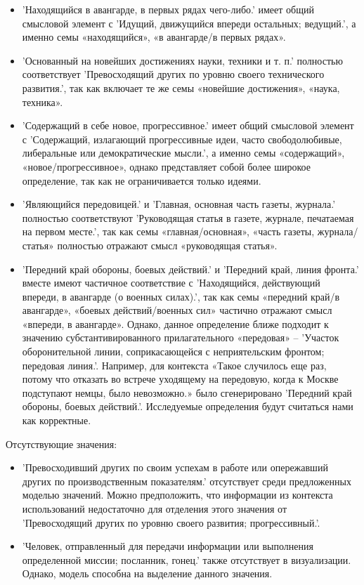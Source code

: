 \begin{itemize}
    \item ’Находящийся в авангарде, в первых рядах чего-либо.’ имеет общий смысловой элемент с
’Идущий, движущийся впереди остальных; ведущий.’,
а именно семы «находящийся», «в авангарде/в первых рядах».

    \item ’Основанный на новейших достижениях науки, техники и т. п.’ полностью соответствует
’Превосходящий других по уровню своего технического развития.’,
так как включает те же семы «новейшие достижения», «наука, техника».

    \item ’Содержащий в себе новое, прогрессивное.’ имеет общий смысловой элемент с
’Содержащий, излагающий прогрессивные идеи, часто свободолюбивые, либеральные или демократические мысли.’,
а именно семы «содержащий», «новое/прогрессивное», однако представляет собой более широкое
определение, так как не ограничивается только идеями.

    \item ’Являющийся передовицей.’ и ’Главная, основная часть газеты, журнала.’ полностью соответствуют
’Руководящая статья в газете, журнале, печатаемая на первом месте.’, так как семы «главная/основная», «часть газеты, журнала/статья» полностью отражают смысл «руководящая статья».
\end{itemize}

\begin{itemize}
    \item ’Передний край обороны, боевых действий.’ и ’Передний край, линия фронта.’
вместе имеют частичное соответствие с ’Находящийся, действующий впереди, в авангарде (о военных силах).’,
так как семы «передний край/в авангарде», «боевых действий/военных сил» частично отражают смысл «впереди, в авангарде».
Однако, данное определение ближе подходит к значению субстантивированного прилагательного «передовая» –
’Участок оборонительной линии, соприкасающейся с неприятельским фронтом; передовая линия.’.
Например, для контекста «Такое случилось еще раз, потому что отказать во встрече уходящему на передовую,
когда к Москве подступают немцы, было невозможно.» было сгенерировано ’Передний край обороны, боевых действий.’.
Исследуемые определения будут считаться нами как корректные.
\end{itemize}

Отсутствующие значения:
\begin{itemize}
    \item ’Превосходивший других по своим успехам в работе или опережавший других по производственным показателям.’
отсутствует среди предложенных моделью значений.
Можно предположить, что информации из контекста использований недостаточно для отделения этого значения от
’Превосходящий других по уровню своего развития; прогрессивный.’. %

    \item ’Человек, отправленный для передачи информации или выполнения определенной миссии; посланник, гонец.’ также отсутствует в визуализации.
Однако, модель способна на выделение данного значения.
\end{itemize}

